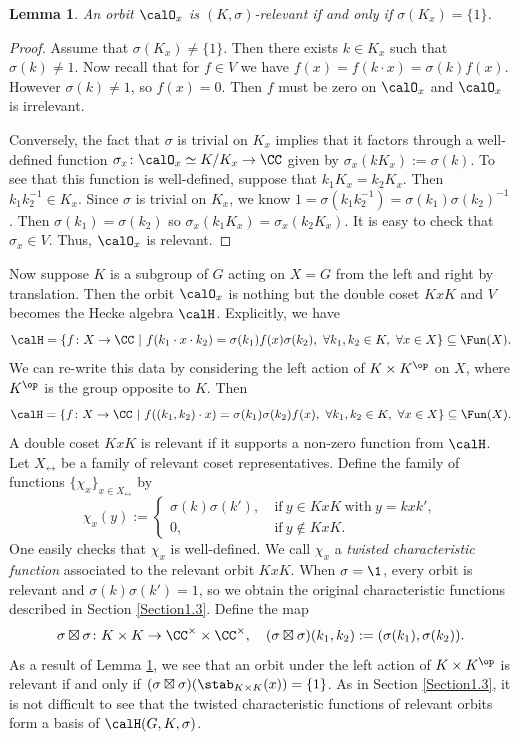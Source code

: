 \documentclass[11pt]{amsart}
\newtheorem{lem}[thm]{Lemma}
\theoremstyle{remark}
\begin{document}
\begin{lem}\label{lemma: relevant_orbit}
	An orbit $\calO_x$ is $(K,\sigma)$-relevant if and only if $\sigma(K_x) = \{1\}$.
\end{lem}
\begin{proof}
	Assume that $\sigma(K_x)\neq\{1\}$.
	Then there exists $k\in K_x$  such that $\sigma(k)\neq 1$.
	Now recall that for $f\in V$ we have $f(x) = f(k\cdot x) = \sigma(k)f(x)$.
	However $\sigma(k)\neq 1$, so $f(x)=0$.
	Then $f$ must be zero on $\calO_x$ and $\calO_x$ is irrelevant.

	Conversely, the fact that $\sigma$ is trivial on $K_x$ implies that it factors through a well-defined function $\sigma_x\colon \calO_x\simeq K/K_x\rightarrow \CC$ given by $\sigma_x(kK_x) := \sigma(k)$.
	To see that this function is well-defined, suppose that $k_1K_x=k_2K_x$.
	Then $k_1k_2^{-1}\in K_x$.
	Since $\sigma$ is trivial on $K_x$, we know $1=\sigma(k_1k_2^{-1})=\sigma(k_1)\sigma(k_2)^{-1}$.
	Then $\sigma(k_1)=\sigma(k_2)$ so $\sigma_x(k_1K_x) = \sigma_x(k_2K_x)$.
	It is easy to check that $\sigma_x\in V$.
	Thus, $\calO_x$ is relevant.
\end{proof}
Now suppose $K$ is a subgroup of $G$ acting on $X=G$ from the left and right by translation.
Then the orbit $\calO_x$ is nothing but the double coset $KxK$ and $V$ becomes the Hecke algebra $\calH$.
Explicitly, we have
\[
	\calH = \{f\colon X\to\CC \ |\ f(k_1\cdot x \cdot k_2) = \sigma(k_1)f(x)\sigma(k_2),\ \forall k_1,k_2\in K,\ \forall x\in X\}\subseteq \Fun(X).
\]
We can re-write this data by considering the left action of $K\times K^\op$ on $X$, where $K^\op$ is the group opposite to $K$.
Then
\[
	\calH = \{f\colon X\to\CC \ |\ f((k_1,k_2)\cdot x) = \sigma(k_1)\sigma(k_2)f(x),\ \forall k_1,k_2\in K,\ \forall x\in X\}\subseteq\Fun(X).
\]
A double coset $KxK$ is relevant if it supports a non-zero function from $\calH$.
Let $X_\rel$ be a family of relevant coset representatives.
Define the family of functions $\{\chi_x\}_{x\in X_\rel}$ by
\[
	\chi_x(y) := \begin{cases}
		\sigma(k)\sigma(k'),\  & \text{if}\ y\in KxK\ \text{with}\ y=kxk', \\
		0,\                    & \text{if}\ y\notin KxK.
	\end{cases}
\]
One easily checks that $\chi_x$ is well-defined.
We call $\chi_x$ a \emph{twisted characteristic function} associated to the relevant orbit $KxK$.
When $\sigma=\1$, every orbit is relevant and $\sigma(k)\sigma(k')=1$, so we obtain the original characteristic functions described in Section \ref{Section1.3}.
Define the map
\[
	\sigma\boxtimes\sigma\colon K\times K\to\CC^\times\times\CC^\times,\quad (\sigma\boxtimes\sigma)(k_1,k_2) := (\sigma(k_1),\sigma(k_2)).
\]
As a result of Lemma \ref{lemma: relevant_orbit}, we see that an orbit under the left action of $K\times K^\op$ is relevant if and only if $(\sigma\boxtimes\sigma)(\stab_{K\times K}(x)) = \{1\}$.
As in Section \ref{Section1.3}, it is not difficult to see that the twisted characteristic functions of relevant orbits form a basis of $\calH(G,K,\sigma)$.
\end{document}

